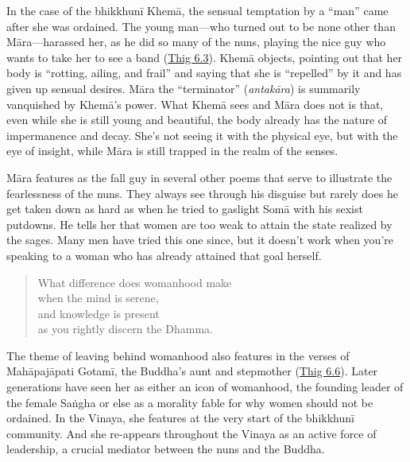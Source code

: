 \documentclass[12pt,openany]{book}%
\begin{document}
In the case of the \textsanskrit{bhikkhunī} \textsanskrit{Khemā}, the sensual temptation by a “man” came after she was ordained. The young man—who turned out to be none other than \textsanskrit{Māra}—harassed her, as he did so many of the nuns, playing the nice guy who wants to take her to see a band (\href{https://suttacentral.net/thig6.3}{Thig 6.3}). \textsanskrit{Khemā} objects, pointing out that her body is “rotting, ailing, and frail” and saying that she is “repelled” by it and has given up sensual desires. \textsanskrit{Māra} the “terminator” (\textit{\textsanskrit{antakāra}}) is summarily vanquished by \textsanskrit{Khemā}’s power. What \textsanskrit{Khemā} sees and \textsanskrit{Māra} does not is that, even while she is still young and beautiful, the body already has the nature of impermanence and decay. She’s not seeing it with the physical eye, but with the eye of insight, while \textsanskrit{Māra} is still trapped in the realm of the senses.

\textsanskrit{Māra} features as the fall guy in several other poems that serve to illustrate the fearlessness of the nuns. They always see through his disguise but rarely does he get taken down as hard as when he tried to gaslight \textsanskrit{Somā} with his sexist putdowns. He tells her that women are too weak to attain the state realized by the sages. Many men have tried this one since, but it doesn’t work when you’re speaking to a woman who has already attained that goal herself.

\begin{verse}%
What difference does womanhood make \\
when the mind is serene, \\
and knowledge is present \\
as you rightly discern the Dhamma.

%
\end{verse}

The theme of leaving behind womanhood also features in the verses of \textsanskrit{Mahāpajāpati} \textsanskrit{Gotamī}, the Buddha’s aunt and stepmother (\href{https://suttacentral.net/thig6.6}{Thig 6.6}). Later generations have seen her as either an icon of womanhood, the founding leader of the female \textsanskrit{Saṅgha} or else as a morality fable for why women should not be ordained. In the Vinaya, she features at the very start of the \textsanskrit{bhikkhunī} community. And she re-appears throughout the Vinaya as an active force of leadership, a crucial mediator between the nuns and the Buddha.
\end{document}
